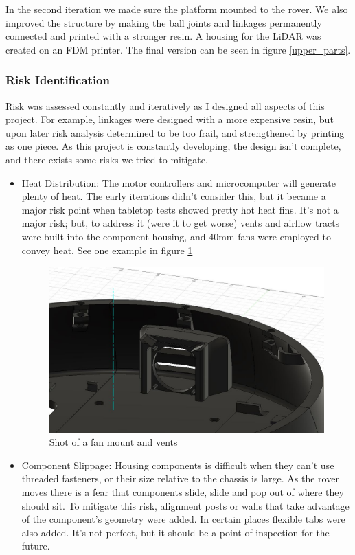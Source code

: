 \documentclass[a4paper, 10pt]{article}
\begin{document}
 		In the second iteration we made sure the platform mounted to the rover. We also improved the structure by making the ball joints and linkages permanently connected and printed with a stronger resin. A housing for the LiDAR was created on an FDM printer. The final version can be seen in figure \ref{upper_parts}.
 		
		\subsubsection*{Risk Identification}
		Risk was assessed constantly and iteratively as I designed all aspects of this project. For example, linkages were designed with a more expensive resin, but upon later risk analysis determined to be too frail, and strengthened by printing as one piece. As this project is constantly developing, the design isn't complete, and there exists some risks we tried to mitigate.
			
			\begin{itemize}
				\item{Heat Distribution:}
				The motor controllers and microcomputer will generate plenty of heat. The early iterations didn't consider this, but it became a major risk point when tabletop tests showed pretty hot heat fins. It's not a major risk; but, to address it (were it to get worse) vents and airflow tracts were built into the component housing, and 40mm fans were employed to convey heat. See one example in figure \ref{ventilation}
				
			\begin{figure} [h]
				\centering
				\includegraphics[scale=0.2]{Photos/ventilation}
				\caption{Shot of a fan mount and vents}
				\label{ventilation}
			\end{figure}
				
				\item{Component Slippage:}
				Housing components is difficult when they can't use threaded fasteners, or their size relative to the chassis is large. As the rover moves there is a fear that components slide, slide and pop out of where they should sit. To mitigate this risk, alignment posts or walls that take advantage of the component's geometry were added. In certain places flexible tabs were also added. It's not perfect, but it should be a point of inspection for the future.
			\end{itemize}			 		
 		
\end{document}
